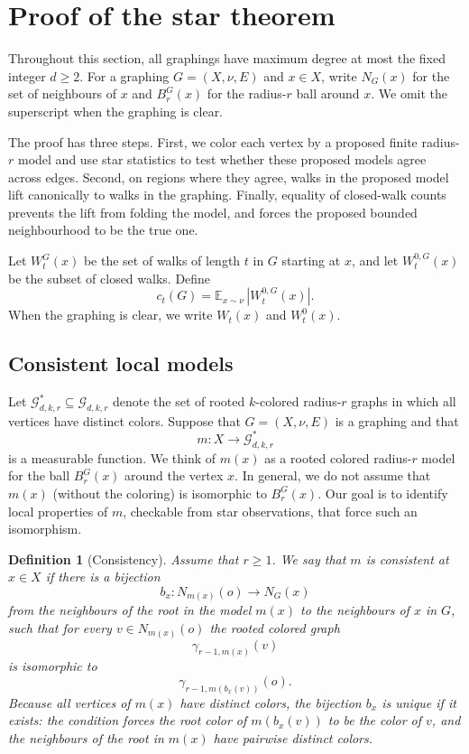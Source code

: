 \documentclass[11pt]{amsart}
\newcommand{\E}{\mathbb E}
\newcommand{\calG}{\mathcal G}
\newtheorem{definition}[theorem]{Definition}
\theoremstyle{remark}
\begin{document}
\section{Proof of the star theorem}\label{sec:proof}

Throughout this section, all graphings have maximum degree at most the fixed integer $d\geq 2$.  For a graphing $G=(X,\nu,E)$ and $x\in X$, write $N_G(x)$ for the set of neighbours of $x$ and $B_r^G(x)$ for the radius-$r$ ball around $x$.  We omit the superscript when the graphing is clear.

The proof has three steps.  First, we color each vertex by a proposed finite radius-$r$ model and use star statistics to test whether these proposed models agree across edges.  Second, on regions where they agree, walks in the proposed model lift canonically to walks in the graphing.  Finally, equality of closed-walk counts prevents the lift from folding the model, and forces the proposed bounded neighbourhood to be the true one.

Let $W_t^G(x)$ be the set of walks of length $t$ in $G$ starting at $x$, and let $W_t^{0,G}(x)$ be the subset of closed walks.  Define
\[
 c_t(G)=\E_{x\sim\nu}\, |W_t^{0,G}(x)|.
\]
When the graphing is clear, we write $W_t(x)$ and $W_t^0(x)$.


\subsection{Consistent local models}

Let $\calG^*_{d,k,r}\subseteq\calG_{d,k,r}$ denote the set of rooted $k$-colored radius-$r$ graphs in which all vertices have distinct colors. Suppose that $G=(X,\nu,E)$ is a graphing and that
\[
 m\colon X\to\calG^*_{d,k,r}
\]
is a measurable function. We think of $m(x)$ as a rooted colored radius-$r$ model for the ball $B_r^G(x)$ around the vertex $x$. In general, we do not assume that $m(x)$ (without the coloring) is isomorphic to $B_r^G(x)$. Our goal is to identify local properties of $m$, checkable from star observations, that force such an isomorphism.

\begin{definition}[Consistency]\label{def:consistency}
Assume that $r\geq 1$. We say that $m$ is \emph{consistent at $x\in X$} if there is a bijection
\[
 b_x\colon N_{m(x)}(o)\to N_G(x)
\]
from the neighbours of the root in the model $m(x)$ to the neighbours of $x$ in $G$, such that for every $v\in N_{m(x)}(o)$ the rooted colored graph
\[
 \gamma_{r-1,m(x)}(v)
\]
is isomorphic to
\[
 \gamma_{r-1,m(b_x(v))}(o).
\]
Because all vertices of $m(x)$ have distinct colors, the bijection $b_x$ is unique if it exists: the condition forces the root color of $m(b_x(v))$ to be the color of $v$, and the neighbours of the root in $m(x)$ have pairwise distinct colors.
\end{definition}
\end{document}
